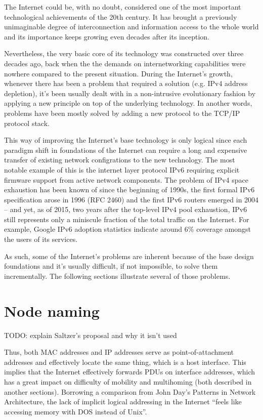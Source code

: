     The Internet could be, with no doubt, considered one of the most important technological achievements of the 20th century. It has brought a previously unimaginable degree of interconnection and information access to the whole world and its importance keeps growing even decades after its inception.

    Nevertheless, the very basic core of its technology was constructed over three decades ago, back when the the demands on internetworking capabilities were nowhere compared to the present situation. During the Internet's growth, whenever there has been a problem that required a solution (e.g. IPv4 address depletion), it's been usually dealt with in a non-intrusive evolutionary fashion by applying a new principle on top of the underlying technology. In another words, problems have been mostly solved by adding a new protocol to the TCP/IP protocol stack.

    This way of improving the Internet's base technology is only logical since each paradigm shift in foundations of the Internet can require a long and expensive transfer of existing network configrations to the new technology. The most notable example of this is the internet layer protocol IPv6 requiring explicit firmware support from active network components. The problem of IPv4 space exhaustion has been known of since the beginning of 1990s, the first formal IPv6 specification arose in 1996 (RFC 2460) and the first IPv6 routers emerged in 2004 -- and yet, as of 2015, two years after the top-level IPv4 pool exhaustion, IPv6 still represents only a miniscule fraction of the total traffic on the Internet. For example, Google IPv6 adoption statistics indicate around 6\% coverage amongst the users of its services.

    As such, some of the Internet's problems are inherent because of the base design foundations and it's usually difficult, if not impossible, to solve them incrementally. The following sections illustrate several of those problems.

    \section{Node naming}

        TODO: explain Saltzer's proposal and why it isn't used

        Thus, both MAC addresses and IP addresses serve as point-of-attachment addresses and effectively locate the same thing, which is a host interface. This implies that the Internet effectively forwards PDUs on interface addresses, which has a great impact on difficulty of mobility and multihoming (both described in another sections). Borrowing a comparison from John Day's Patterns in Network Architecture, the lack of implicit logical addressing in the Internet ``feels like accessing memory with DOS instead of Unix''.

